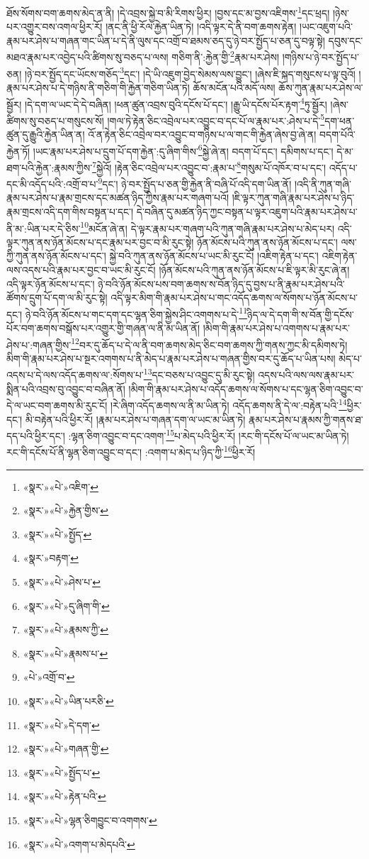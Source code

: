 ཐོས་སོགས་བག་ཆགས་མེད་ན་ནི། །དེ་འབྲས་སྐྱེ་བ་མི་རིགས་ཕྱིར། །བྱས་དང་མ་བྱས་འཇིགས་\footnote{«སྣར་»«པེ་»འཇིག་}དང་ཕྲད། །ཉེས་པར་འགྱུར་བས་འགལ་ཕྱིར་རོ། །ནང་ནི་ཕྱི་རོལ་རྐྱེན་ཡིན་ཏེ། །འདི་ལྟར་དེ་ནི་བག་ཆགས་རྟེན། །ཡང་འཇུག་པའི་རྣམ་པར་ཤེས་པ་གཞན་གང་ཡིན་པ་དེ་ནི་ལུས་དང་འགྲོ་བ་ཐམས་ཅད་དུ་ཉེ་བར་སྤྱོད་པ་ཅན་དུ་བལྟ་སྟེ། དབུས་དང་མཐའ་རྣམ་པར་འབྱེད་པའི་ཚིགས་སུ་བཅད་པ་ལས། གཅིག་ནི་:རྐྱེན་གྱི་\footnote{«སྣར་»«པེ་»རྐྱེན་གྱིས་}རྣམ་པར་ཤེས། །གཉིས་པ་ཉེ་བར་སྤྱོད་པ་ཅན། །ཉེ་བར་སྤྱོད་དང་ཡོངས་གཅོད་\footnote{«སྣར་»«པེ་»སྤྱོད་}དང་། །དེ་ཡི་འཇུག་བྱེད་སེམས་ལས་བྱུང་། །ཞེས་ཇི་སྐད་གསུངས་པ་ལྟ་བུའོ། །རྣམ་པར་ཤེས་པ་དེ་གཉིས་ནི་གཅིག་གི་རྐྱེན་གཅིག་ཡིན་ཏེ། ཆོས་མངོན་པའི་མདོ་ལས། ཆོས་ཀུན་རྣམ་པར་ཤེས་ལ་སྦྱོར། །དེ་དག་ལ་ཡང་དེ་དེ་བཞིན། །ཕན་ཚུན་འབྲས་བུའི་དངོས་པོ་དང་། །རྒྱུ་ཡི་དངོས་པོར་རྟག་\footnote{«སྣར་»བརྟག་}ཏུ་སྦྱོར། །ཞེས་ཚིགས་སུ་བཅད་པ་གསུངས་སོ། །གལ་ཏེ་རྟེན་ཅིང་འབྲེལ་པར་འབྱུང་བ་དང་པོ་ལ་རྣམ་པར་:ཤེས་པ་དེ་\footnote{«སྣར་»«པེ་»ཤེས་པ་}དག་ཕན་ཚུན་དུ་རྒྱུའི་རྐྱེན་ཡིན་ན། འོ་ན་རྟེན་ཅིང་འབྲེལ་བར་འབྱུང་བ་གཉིས་པ་ལ་གང་གི་རྐྱེན་ཞེས་བྱ་ཞེ་ན། བདག་པོའི་རྐྱེན་ཏོ། །ཡང་རྣམ་པར་ཤེས་པ་དྲུག་པོ་དག་རྐྱེན་:དུ་ཞིག་གིས་\footnote{«སྣར་»«པེ་»དུ་ཞིག་གི་}སྐྱེ་ཞེ་ན། བདག་པོ་དང་། དམིགས་པ་དང་། དེ་མ་ཐག་པའི་རྐྱེན་:རྣམས་ཀྱིས་\footnote{«སྣར་»«པེ་»རྣམས་ཀྱི་}སྐྱེའོ། །རྟེན་ཅིང་འབྲེལ་པར་འབྱུང་བ་:རྣམ་པ་\footnote{«སྣར་»«པེ་»རྣམས་པ་}གསུམ་པོ་འཁོར་བ་པ་དང་། འདོད་པ་དང་མི་འདོད་པའི་:འགྲོ་བ་པ་\footnote{«པེ་»འགྲོ་བ་}དང་། ཉེ་བར་སྤྱོད་པ་ཅན་གྱི་རྐྱེན་ནི་བཞི་པོ་འདི་དག་ཡིན་ནོ། །འདི་ནི་ཀུན་གཞི་རྣམ་པར་ཤེས་པ་རྣམ་གྲངས་དང་མཚན་ཉིད་ཀྱིས་རྣམ་པར་གཞག་པའོ། །ཇི་ལྟར་ཀུན་གཞི་རྣམ་པར་ཤེས་པ་ཉིད་རྣམ་གྲངས་འདི་དག་གིས་བསྟན་པ་དང་། དེ་བཞིན་དུ་མཚན་ཉིད་ཀྱང་བསྟན་པ་ལྟར་འཇུག་པའི་རྣམ་པར་ཤེས་པ་ནི་མ་:ཡིན་པར་དེ་ཅིས་\footnote{«སྣར་»«པེ་»ཡིན་པརཅི་}མངོན་ཞེ་ན། དེ་ལྟར་རྣམ་པར་གཞག་པའི་ཀུན་གཞི་རྣམ་པར་ཤེས་པ་མེད་པར། འདི་ལྟར་ཀུན་ནས་ཉོན་མོངས་པ་དང་རྣམ་པར་བྱང་བ་མི་རུང་སྟེ། ཉོན་མོངས་པའི་ཀུན་ནས་ཉོན་མོངས་པ་དང་། ལས་ཀྱི་ཀུན་ནས་ཉོན་མོངས་པ་དང་། སྐྱེ་བའི་ཀུན་ནས་ཉོན་མོངས་པ་ཡང་མི་རུང་ངོ། །འཇིག་རྟེན་པ་དང་། འཇིག་རྟེན་ལས་འདས་པའི་རྣམ་པར་བྱང་བ་ཡང་མི་རུང་ངོ། །ཉོན་མོངས་པའི་ཀུན་ནས་ཉོན་མོངས་པ་ཇི་ལྟར་མི་རུང་ཞེ་ན། འདི་ལྟར་ཉོན་མོངས་པ་དང་། ཉེ་བའི་ཉོན་མོངས་པས་བག་ཆགས་ས་བོན་ཉིད་དུ་བྱས་པ་ནི་རྣམ་པར་ཤེས་པའི་ཚོགས་དྲུག་པོ་དག་ལ་མི་རུང་སྟེ། འདི་ལྟར་མིག་གི་རྣམ་པར་ཤེས་པ་གང་འདོད་ཆགས་ལ་སོགས་པ་ཉོན་མོངས་པ་དང་། ཉེ་བའི་ཉོན་མོངས་པ་གང་དག་དང་ལྷན་ཅིག་སྐྱེས་ཤིང་འགགས་པ་དེ་\footnote{«སྣར་»«པེ་»དེ་དག་}ཉིད་ལ་དེ་དག་གི་ས་བོན་གྱི་དངོས་པོར་བག་ཆགས་བསྒོས་པར་འགྱུར་གྱི་གཞན་ལ་ནི་མ་ཡིན་ནོ། །མིག་གི་རྣམ་པར་ཤེས་པ་འགགས་པ་རྣམ་པར་ཤེས་པ་:གཞན་གྱིས་\footnote{«སྣར་»«པེ་»གཞན་གྱི་}བར་དུ་ཆོད་པ་དེ་ལ་ནི་བག་ཆགས་མེད་ཅིང་བག་ཆགས་ཀྱི་གནས་ཀྱང་མི་དམིགས་ཏེ། མིག་གི་རྣམ་པར་ཤེས་པ་སྔར་འགགས་པ་ནི་མེད་པ་རྣམ་པར་ཤེས་པ་གཞན་གྱིས་བར་དུ་ཆོད་པ་ཡིན་པས། མེད་པ་འདས་པ་དེ་ལས་འདོད་ཆགས་ལ་:སོགས་པ་\footnote{«སྣར་»«པེ་»སྤྱོད་པ་}དང་བཅས་པ་འབྱུང་དུ་མི་རུང་སྟེ། འདས་པའི་ལས་ལས་རྣམ་པར་སྨིན་པའི་འབྲས་བུ་འབྱུང་བ་བཞིན་ནོ། །མིག་གི་རྣམ་པར་ཤེས་པ་འདོད་ཆགས་ལ་སོགས་པ་དང་ལྷན་ཅིག་འབྱུང་བ་དེ་ལ་ཡང་བག་ཆགས་མི་རུང་ངོ། །རེ་ཞིག་འདོད་ཆགས་ལ་ནི་མ་ཡིན་ཏེ། འདོད་ཆགས་ནི་དེ་ལ་:བརྟེན་པའི་\footnote{«སྣར་»«པེ་»རྟེན་པའི་}ཕྱིར་དང་། མི་བརྟེན་པའི་ཕྱིར་རོ། །རྣམ་པར་ཤེས་པ་གཞན་དག་ལ་ཡང་མ་ཡིན་ཏེ། རྣམ་པར་ཤེས་པ་རྣམས་ཀྱི་གནས་ཐ་དད་པའི་ཕྱིར་དང་། :ལྷན་ཅིག་འབྱུང་བ་དང་འགག་\footnote{«སྣར་»«པེ་»ལྷན་ཅིགབྱུང་བ་འགགས་}པ་མེད་པའི་ཕྱིར་རོ། །རང་གི་དངོས་པོ་ལ་ཡང་མ་ཡིན་ཏེ། རང་གི་དངོས་པོ་ནི་ལྷན་ཅིག་འབྱུང་བ་དང་། :འགག་པ་མེད་པ་ཉིད་ཀྱི་\footnote{«སྣར་»«པེ་»འགག་པ་མེདཔའི་}ཕྱིར་རོ། 